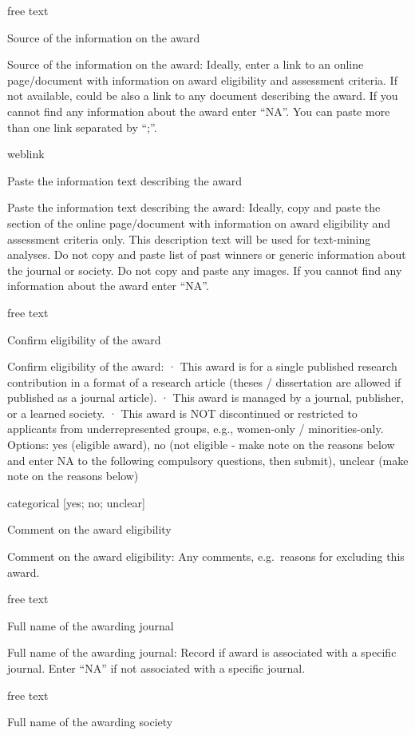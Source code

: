 \documentclass[
]{article}
\begin{document}
free text

Source of the information on the award

Source of the information on the award: Ideally, enter a link to an
online page/document with information on award eligibility and
assessment criteria. If not available, could be also a link to any
document describing the award. If you cannot find any information about
the award enter ``NA''. You can paste more than one link separated by
``;''.

weblink

Paste the information text describing the award

Paste the information text describing the award: Ideally, copy and paste
the section of the online page/document with information on award
eligibility and assessment criteria only. This description text will be
used for text-mining analyses. Do not copy and paste list of past
winners or generic information about the journal or society. Do not copy
and paste any images. If you cannot find any information about the award
enter ``NA''.

free text

Confirm eligibility of the award

Confirm eligibility of the award: · This award is for a single published
research contribution in a format of a research article (theses /
dissertation are allowed if published as a journal article). · This
award is managed by a journal, publisher, or a learned society. · This
award is NOT discontinued or restricted to applicants from
underrepresented groups, e.g., women-only / minorities-only. Options:
yes (eligible award), no (not eligible - make note on the reasons below
and enter NA to the following compulsory questions, then submit),
unclear (make note on the reasons below)

categorical {[}yes; no; unclear{]}

Comment on the award eligibility

Comment on the award eligibility: Any comments, e.g.~reasons for
excluding this award.

free text

Full name of the awarding journal

Full name of the awarding journal: Record if award is associated with a
specific journal. Enter ``NA'' if not associated with a specific
journal.

free text

Full name of the awarding society
\end{document}
